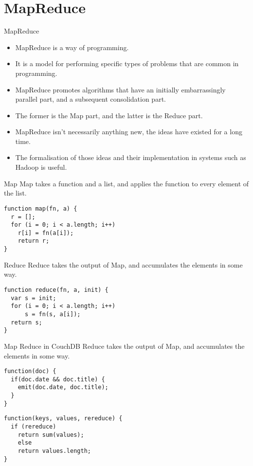 \section{MapReduce}

\begin{frame}{MapReduce}
	\begin{itemize}
		\item MapReduce is a way of programming.
		\item It is a model for performing specific types of problems that are common in programming.
		\item MapReduce promotes algorithms that have an initially embarrassingly parallel part, and a subsequent consolidation part.
		\item The former is the Map part, and the latter is the Reduce part.
		\item MapReduce isn't necessarily anything new, the ideas have existed for a long time.
		\item The formalisation of those ideas and their implementation in systems such as Hadoop is useful.
	\end{itemize}
\end{frame}

\begin{frame}[fragile]{Map}
Map takes a function and a list, and applies the function to every element of the list.
  \begin{verbatim}
function map(fn, a) {
  r = [];
  for (i = 0; i < a.length; i++)
  	r[i] = fn(a[i]);
	return r;
}
	\end{verbatim}
\end{frame}

\begin{frame}[fragile]{Reduce}
Reduce takes the output of Map, and accumulates the elements in some way.
  \begin{verbatim}
function reduce(fn, a, init) {
  var s = init;
  for (i = 0; i < a.length; i++)
      s = fn(s, a[i]);
  return s;
}
	\end{verbatim}
\end{frame}

\begin{frame}[fragile]{Map Reduce in CouchDB}
Reduce takes the output of Map, and accumulates the elements in some way.
  \begin{verbatim}
function(doc) {
  if(doc.date && doc.title) {
    emit(doc.date, doc.title);
  }
}
	\end{verbatim}
	
  \begin{verbatim}
function(keys, values, rereduce) {
  if (rereduce)
    return sum(values);
	else
    return values.length;
}
	\end{verbatim}
	

\end{frame}
